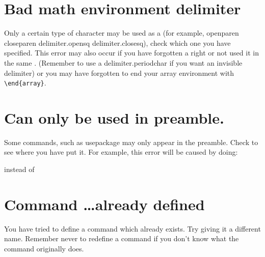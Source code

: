 
\section{Bad math environment delimiter}

Only a certain type of character may be used as a 
 (for example,
\gls{openparen} \gls{closeparen} \gls{delimiter.opensq}
\gls{delimiter.closesq}), check which one you have specified.  This error may 
also occur if you have forgotten a \gls{right} or not used it in the
same .
(Remember to use a \gls{delimiter.periodchar} if you want an invisible delimiter) or 
you may have forgotten to end your array environment with 
\verb|\end{array}|.


\section{Can only be used in preamble.}

Some commands, such as \gls{usepackage} may only appear in the 
\gls{preamble}.  Check to see where you have put 
it.  For example, this error will be caused by doing:
\begin{alltt}

\wrong

\end{alltt}
instead of
\begin{alltt}

\correct

\end{alltt}


\section{Command \texorpdfstring{\protect\ldots}{...}\protect\space already defined}

You have tried to define a \gls{command} which 
already exists.  Try giving it a different name.  Remember never to
redefine a command if you don't know what the command originally
does.

